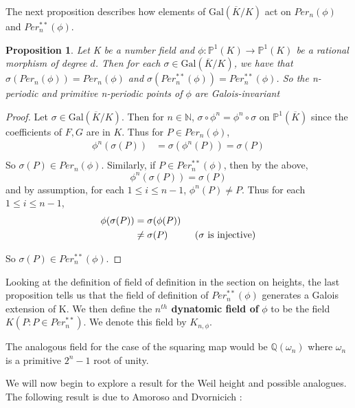 \documentclass[12pt]{amsart}
\newtheorem{prop}[thm]{Proposition}
\theoremstyle{definition}
\theoremstyle{remark}
\theoremstyle{definition}
\newcommand{\N}{\mathbb{N}}
\newcommand{\Q}{\mathbb{Q}}
\renewcommand{\P}{\mathbb{P}}
\begin{document}
The next proposition describes how elements of $\mathrm{Gal}(\overline{K}/K)$ act on $Per_n(\phi)$ and $Per_n^{**}(\phi)$.

\begin{prop}
Let K be a number field and $\phi: \P^1(K) \rightarrow \P^1(K)$ be a rational morphism of degree $d$. Then for each $\sigma \in \mathrm{Gal}(\overline{K}/K)$, we have that $\sigma(Per_n(\phi)) = Per_n(\phi)$ and $\sigma(Per_n^{**}(\phi)) = Per_n^{**}(\phi)$. So the n-periodic and primitive n-periodic points of $\phi$ are Galois-invariant
\end{prop}
 
\begin{proof}
Let $\sigma \in \mathrm{Gal}(\overline{K}/K)$. Then for $n \in \N$, $\sigma \circ \phi^n = \phi^n \circ \sigma$ on $\P^1(\overline{K})$ since the coefficients of $F,G$ are in $K$. Thus for $P \in Per_n(\phi)$,
\begin{align*}
\phi^n(\sigma(P)) 
&= \sigma(\phi^n(P)) = \sigma(P)  \\
\end{align*}
So $\sigma(P) \in Per_n(\phi)$. Similarly, if $P \in Per_n^{**}(\phi)$, then by the above, $$\phi^n(\sigma(P))  = \sigma(P)$$ and by assumption, for each $1 \leq i \leq n-1$, $\phi^n(P) \neq P$. Thus for each  $1 \leq i \leq n-1$,
\begin{align*}
\phi(\sigma(P)) 
&= \sigma(\phi(P))\\
& \neq \sigma(P) \hspace{10mm} \text{(}\sigma \text{ is injective)}  \\
\end{align*} 

So $\sigma(P) \in Per_n^{**}(\phi)$.

\end{proof} 
  
Looking at the definition of field of definition in the section on heights, the last proposition tells us that the field of definition of $Per_n^{**}(\phi)$ generates a Galois extension of K. We then define the \textbf{$n^{th}$ dynatomic field of }$\phi$ to be the field $K(P:P \in Per_n^{**})$. We denote this field by $K_{n,\phi}$.

The analogous field for the case of the squaring map would be $\Q(\omega_n)$ where $\omega_n$ is a primitive $2^{n}-1$ root of unity. 

We will now begin to explore a result for the Weil height and possible analogues. The following result is due to Amoroso and Dvornicich \cite{AD}:
\end{document}
